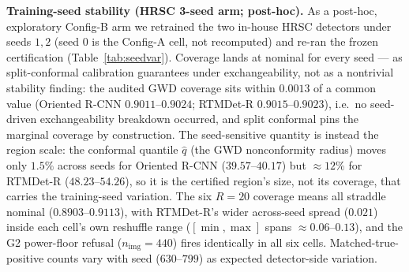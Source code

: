 \documentclass[journal]{IEEEtran}
\begin{document}
\textbf{Training-seed stability (HRSC 3-seed arm; post-hoc).} As a post-hoc, exploratory Config-B arm we
retrained the two in-house HRSC detectors under seeds $1,2$ (seed $0$ is the Config-A cell, not recomputed) and
re-ran the frozen certification (Table~\ref{tab:seedvar}). Coverage lands at nominal for every seed --- as
split-conformal calibration guarantees under exchangeability, not as a nontrivial stability finding: the
audited GWD coverage sits within $0.0013$ of a common value (Oriented R-CNN $0.9011$--$0.9024$; RTMDet-R
$0.9015$--$0.9023$), i.e.\ no seed-driven exchangeability breakdown occurred, and split conformal pins the
marginal coverage by construction. The seed-sensitive quantity is instead the region scale: the conformal
quantile $\hat q$ (the GWD nonconformity radius) moves only $1.5\%$ across seeds for Oriented R-CNN
($39.57$--$40.17$) but $\approx12\%$ for RTMDet-R ($48.23$--$54.26$), so it is the certified region's
size, not its coverage, that carries the training-seed variation. The six $R{=}20$ coverage means all
straddle nominal ($0.8903$--$0.9113$), with RTMDet-R's wider across-seed spread ($0.021$) inside each cell's
own reshuffle range ($[\min,\max]$ spans $\approx0.06$--$0.13$), and the G2 power-floor refusal
($n_{\mathrm{img}}=440$) fires identically in all six cells. Matched-true-positive counts vary with seed
($630$--$799$) as expected detector-side variation.
\end{document}
